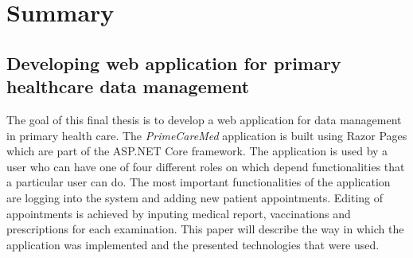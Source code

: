 \section*{Summary}
\subsection*{Developing web application for primary healthcare data management}
The goal of this final thesis is to develop a web application for data management in primary health care. The \textit{PrimeCareMed} application is built using Razor Pages which are part of the ASP.NET Core framework. The application is used by a user who can have one of four different roles on which depend functionalities that a particular user can do. The most important functionalities of the application are logging into the system and adding new patient appointments. Editing of appointments is achieved by inputing medical report, vaccinations and prescriptions for each examination. This paper will describe the way in which the application was implemented and the presented technologies that were used.
